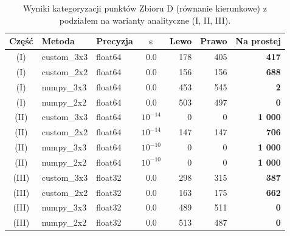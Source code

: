 \documentclass[10pt,a4paper]{article}
\begin{document}
\begin{table}[htbp]
\centering
\caption{Wyniki kategoryzacji punktów Zbioru D (równanie kierunkowe) z podziałem na warianty analityczne (I, II, III).}
\label{tab:set_d}
\small
\begin{tabular}{cllcrrr}
\toprule
\textbf{Część} & \textbf{Metoda} & \textbf{Precyzja} & $\boldsymbol{\varepsilon}$ & \textbf{Lewo} & \textbf{Prawo} & \textbf{Na prostej} \\
\midrule
(I) & custom\_3x3 & float64 & 0.0 & 178 & 405 & \textbf{417} \\
(I) & custom\_2x2 & float64 & 0.0 & 156 & 156 & \textbf{688} \\
(I) & numpy\_3x3  & float64 & 0.0 & 453 & 545 & \textbf{2} \\
(I) & numpy\_2x2  & float64 & 0.0 & 503 & 497 & \textbf{0} \\
\midrule
(II) & custom\_3x3 & float64 & $10^{-14}$ & 0 & 0 & \textbf{1 000} \\
(II) & custom\_2x2 & float64 & $10^{-14}$ & 147 & 147 & \textbf{706} \\
(II) & numpy\_3x3  & float64 & $10^{-10}$ & 0 & 0 & \textbf{1 000} \\
(II) & numpy\_2x2  & float64 & $10^{-10}$ & 0 & 0 & \textbf{1 000} \\
\midrule
(III) & custom\_3x3 & float32 & 0.0 & 298 & 315 & \textbf{387} \\
(III) & custom\_2x2 & float32 & 0.0 & 163 & 175 & \textbf{662} \\
(III) & numpy\_3x3  & float32 & 0.0 & 489 & 511 & \textbf{0} \\
(III) & numpy\_2x2  & float32 & 0.0 & 513 & 487 & \textbf{0} \\
\bottomrule
\end{tabular}
\end{table}
\end{document}
